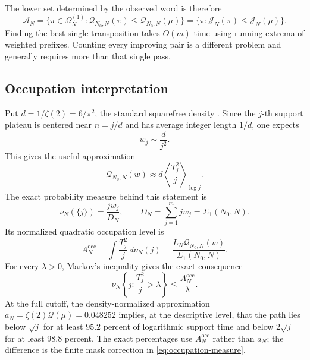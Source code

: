 \documentclass[11pt,reqno]{amsart}
\numberwithin{equation}{section}
\theoremstyle{plain}
\theoremstyle{definition}
\theoremstyle{remark}
\newcommand{\Om}{\Omega}
\newcommand{\QF}{\mathcal Q}
\newcommand{\cA}{\mathcal A}
\begin{document}
The lower set determined by the observed word is therefore
\begin{equation}
\cA_N
=\{\pi\in\Om_N^{(1)}:\QF_{N_0,N}(\pi)
\leq\QF_{N_0,N}(\mu)\}
=\{\pi:\mathcal J_N(\pi)\leq\mathcal J_N(\mu)\}.
\label{eq:lower-mass-set}
\end{equation}
Finding the best single transposition takes \(O(m)\) time using running
extrema of weighted prefixes.  Counting every improving pair is a different
problem and generally requires more than that single pass.

\subsection{Occupation interpretation}
\label{subsec:occupation-interpretation}

Put \(d=1/\zeta(2)=6/\pi^2\), the standard squarefree density
\cite{MontgomeryVaughan2007}.  Since the \(j\)-th support plateau is centered
near \(n=j/d\) and has average integer length \(1/d\), one expects
\begin{equation}
w_j\sim\frac{d}{j^2}.
\label{eq:plateau-weight-asymptotic}
\end{equation}
This gives the useful approximation
\begin{equation}
\QF_{N_0,N}(w)
\approx d\left\langle\frac{T_j^2}{j}\right\rangle_{\log j}.
\label{eq:logarithmic-occupation-approximation}
\end{equation}
The exact probability measure behind this statement is
\begin{equation}
\nu_N(\{j\})=\frac{jw_j}{D_N},\qquad
D_N=\sum_{j=1}^m jw_j=\Sigma_1(N_0,N).
\label{eq:occupation-measure}
\end{equation}
Its normalized quadratic occupation level is
\begin{equation}
A_N^{\mathrm{occ}}
=\int\frac{T_j^2}{j}\,d\nu_N(j)
=\frac{L_N\QF_{N_0,N}(w)}{\Sigma_1(N_0,N)}.
\label{eq:exact-occupation-level}
\end{equation}
For every \(\lambda>0\), Markov's inequality gives the exact consequence
\begin{equation}
\nu_N\left\{j:\frac{T_j^2}{j}>\lambda\right\}
\leq\frac{A_N^{\mathrm{occ}}}{\lambda}.
\label{eq:occupation-markov}
\end{equation}
At the full cutoff, the density-normalized approximation
\(a_N=\zeta(2)\QF(\mu)=0.048252\) implies, at the descriptive level, that the
path lies below \(\sqrt j\) for at least \(95.2\) percent of logarithmic
support time and below \(2\sqrt j\) for at least \(98.8\) percent.  The exact
percentages use \(A_N^{\mathrm{occ}}\) rather than \(a_N\); the difference is
the finite mask correction in \eqref{eq:occupation-measure}.
\end{document}
